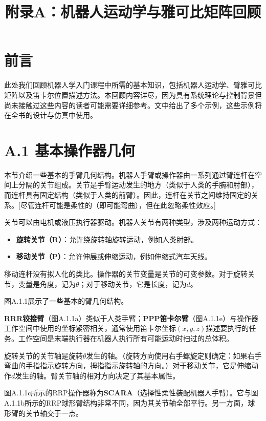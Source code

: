 \documentclass[UTF8,a4paper]{ctexart}
\title{附录A：机器人运动学与雅可比矩阵回顾}
\date{}
\begin{document}
  \maketitle
\fi

\section*{前言}

此处我们回顾机器人学入门课程中所需的基本知识，包括机器人运动学、臂雅可比矩阵以及笛卡尔位置描述方法。本回顾内容详尽，因为具有系统理论与控制背景但尚未接触过这些内容的读者可能需要详细参考。文中给出了多个示例，这些示例将在全书的设计与仿真中使用。

\section{A.1 基本操作器几何}

本节介绍一些基本的手臂几何结构。机器人手臂或操作器由一系列通过臂连杆在空间上分隔的关节组成。关节是手臂运动发生的地方（类似于人类的手腕和肘部），而连杆具有固定结构（类似于人类的前臂）。因此，连杆在关节之间维持固定的关系。[尽管连杆可能是柔性的（即可能弯曲），但在此忽略柔性效应。]

关节可以由电机或液压执行器驱动。机器人关节有两种类型，涉及两种运动方式：
\begin{itemize}
    \item \textbf{旋转关节（R）}：允许绕旋转轴旋转运动，例如人类肘部。
    \item \textbf{移动关节（P）}：允许伸展或伸缩运动，例如伸缩式汽车天线。
\end{itemize}

移动连杆没有拟人化的类比。操作器的关节变量是关节的可变参数。对于旋转关节，变量是角度，记为$\theta$；对于移动关节，它是长度，记为$d$。

图A.1.1展示了一些基本的臂几何结构。

\textbf{RRR铰接臂}（图A.1.1a）类似于人类手臂；\textbf{PPP笛卡尔臂}（图A.1.1e）与操作器工作空间中使用的坐标紧密相关，通常使用笛卡尔坐标$(x, y, z)$描述要执行的任务。工作空间是末端执行器在机器人执行所有可能运动时扫过的总体积。

旋转关节的关节轴是旋转$\theta$发生的轴。（旋转方向使用右手螺旋定则确定：如果右手弯曲的手指指示旋转方向，拇指指示旋转轴的方向。）对于移动关节，它是伸缩动作$d$发生的轴。臂关节轴的相对方向决定了其基本属性。

图A.1.1c所示的RRP操作器称为\textbf{SCARA}（选择性柔性装配机器人手臂）。它与图A.1.1b所示的RRP球形臂结构非常不同，因为其关节轴全部平行。另一方面，球形臂的关节轴交于一点。
\end{document}
